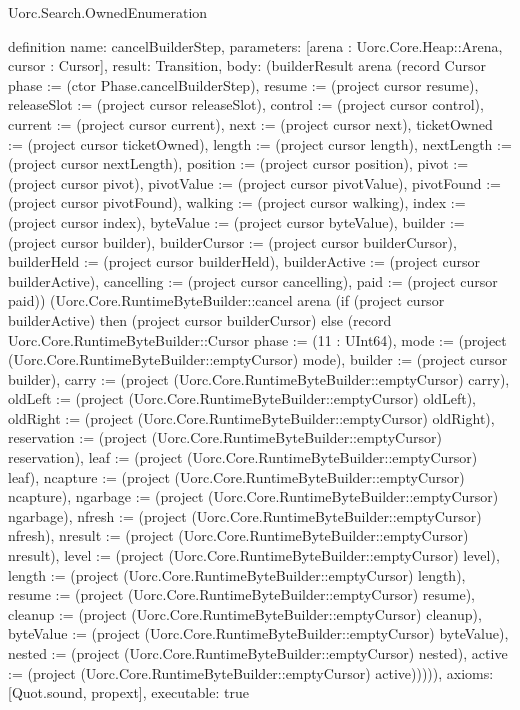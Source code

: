 \begin{lexlean}{Uorc.Search.OwnedEnumeration}
\begin{semanticmodule}
definition{
  name: cancelBuilderStep,
  parameters: [arena : Uorc.Core.Heap::Arena, cursor : Cursor],
  result: Transition,
  body: (builderResult arena (record Cursor {phase := (ctor Phase.cancelBuilderStep), resume := (project cursor resume), releaseSlot := (project cursor releaseSlot), control := (project cursor control), current := (project cursor current), next := (project cursor next), ticketOwned := (project cursor ticketOwned), length := (project cursor length), nextLength := (project cursor nextLength), position := (project cursor position), pivot := (project cursor pivot), pivotValue := (project cursor pivotValue), pivotFound := (project cursor pivotFound), walking := (project cursor walking), index := (project cursor index), byteValue := (project cursor byteValue), builder := (project cursor builder), builderCursor := (project cursor builderCursor), builderHeld := (project cursor builderHeld), builderActive := (project cursor builderActive), cancelling := (project cursor cancelling), paid := (project cursor paid)}) (Uorc.Core.RuntimeByteBuilder::cancel arena (if (project cursor builderActive) then (project cursor builderCursor) else (record Uorc.Core.RuntimeByteBuilder::Cursor {phase := (11 : UInt64), mode := (project (Uorc.Core.RuntimeByteBuilder::emptyCursor) mode), builder := (project cursor builder), carry := (project (Uorc.Core.RuntimeByteBuilder::emptyCursor) carry), oldLeft := (project (Uorc.Core.RuntimeByteBuilder::emptyCursor) oldLeft), oldRight := (project (Uorc.Core.RuntimeByteBuilder::emptyCursor) oldRight), reservation := (project (Uorc.Core.RuntimeByteBuilder::emptyCursor) reservation), leaf := (project (Uorc.Core.RuntimeByteBuilder::emptyCursor) leaf), ncapture := (project (Uorc.Core.RuntimeByteBuilder::emptyCursor) ncapture), ngarbage := (project (Uorc.Core.RuntimeByteBuilder::emptyCursor) ngarbage), nfresh := (project (Uorc.Core.RuntimeByteBuilder::emptyCursor) nfresh), nresult := (project (Uorc.Core.RuntimeByteBuilder::emptyCursor) nresult), level := (project (Uorc.Core.RuntimeByteBuilder::emptyCursor) level), length := (project (Uorc.Core.RuntimeByteBuilder::emptyCursor) length), resume := (project (Uorc.Core.RuntimeByteBuilder::emptyCursor) resume), cleanup := (project (Uorc.Core.RuntimeByteBuilder::emptyCursor) cleanup), byteValue := (project (Uorc.Core.RuntimeByteBuilder::emptyCursor) byteValue), nested := (project (Uorc.Core.RuntimeByteBuilder::emptyCursor) nested), active := (project (Uorc.Core.RuntimeByteBuilder::emptyCursor) active)})))),
  axioms: [Quot.sound, propext],
  executable: true
}


\end{semanticmodule}
\end{lexlean}
